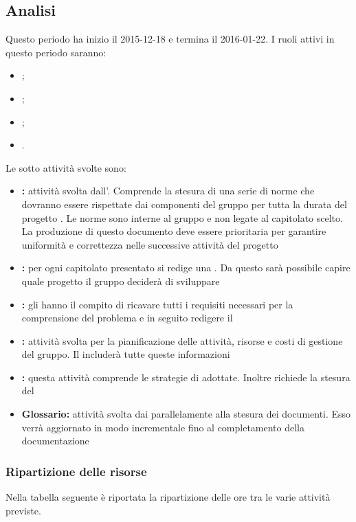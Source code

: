 \documentclass[12pt,a4paper]{article}
\begin{document}
\subsection{Analisi} %
Questo periodo ha inizio il 2015-12-18 e termina il 2016-01-22. I ruoli attivi in questo periodo saranno:
\begin{itemize}
	\item \PM{};
	\item \AM{};
	\item \AN{};
	\item \VR{}.
\end{itemize}
Le sotto attività svolte sono:
\begin{itemize}
	\item \textbf{\NdP{}:} attività svolta dall’\AM{}. Comprende la stesura di una serie di norme che dovranno essere rispettate dai componenti del gruppo per tutta la durata del progetto \textit{\prjL{}}. Le norme sono interne al gruppo e non legate al capitolato scelto. La produzione di questo documento deve essere prioritaria per garantire uniformità e correttezza nelle successive attività del progetto
	\item \textbf{\SdF{}:} per ogni capitolato presentato si redige una \SdF{}. Da questo sarà possibile capire quale progetto il gruppo deciderà di sviluppare
	\item \textbf{\AdR{}:} gli  hanno il compito di ricavare tutti i requisiti necessari per la comprensione del problema e in seguito redigere il \AdR{}
	\item \textbf{\PdP{}:} attività svolta per la pianificazione delle attività, risorse e costi di gestione del gruppo. Il \PdP{} includerà tutte queste informazioni
	\item \textbf{\PdQ{}:} questa attività comprende le strategie di \FVV{} adottate. Inoltre richiede la stesura del \PdQ{}
	\item \textbf{Glossario:} attività svolta dai  parallelamente alla stesura dei documenti. Esso verrà aggiornato in modo incrementale fino al completamento della documentazione
\end{itemize}

\newpage
\subsubsection{Ripartizione delle risorse}
Nella tabella seguente è riportata la ripartizione delle ore tra le varie attività previste.
\end{document}
